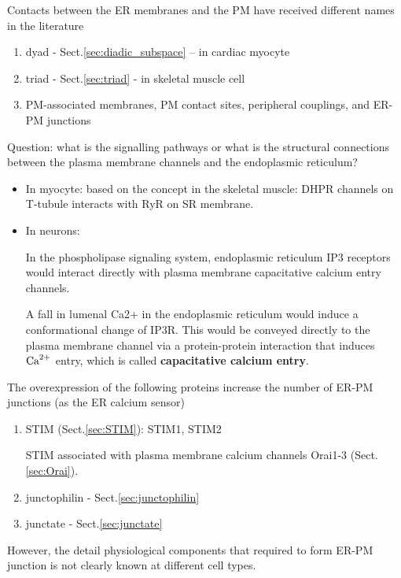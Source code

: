 Contacts between the ER membranes and the PM have received different names in the
literature
\begin{enumerate}
  \item dyad - Sect.\ref{sec:diadic_subspace} -- in cardiac myocyte
  
  \item triad - Sect.\ref{sec:triad} - in skeletal muscle cell
  
  \item PM-associated membranes, PM contact sites, peripheral
couplings, and ER-PM junctions
\end{enumerate}

\begin{mdframed}

Question: what is the signalling pathways or what is the structural connections
between the plasma membrane channels and the endoplasmic reticulum?
\begin{itemize}
  \item In myocyte: based on the concept in the skeletal muscle: DHPR channels
  on T-tubule interacts with RyR on SR membrane.

  \item In neurons:
   
In the phospholipase signaling system, endoplasmic reticulum IP3 receptors would
interact directly with plasma membrane capacitative calcium entry channels.

A fall in lumenal Ca2+ in the endoplasmic reticulum would induce a
conformational change of IP3R. This would be conveyed directly to the plasma
membrane channel via a protein-protein interaction that induces ${\text{Ca}^{2+}}$ entry,
which is called {\bf capacitative calcium entry}.

\end{itemize}

\end{mdframed}


The overexpression of the following proteins increase the number of
ER-PM junctions (as the ER calcium sensor)
\begin{enumerate}
  
  \item STIM (Sect.\ref{sec:STIM}): STIM1, STIM2

STIM associated with plasma membrane calcium channels Orai1-3
(Sect.\ref{sec:Orai}).

  \item junctophilin - Sect.\ref{sec:junctophilin}
  
  \item junctate - Sect.\ref{sec:junctate}
\end{enumerate}
However, the detail physiological components that required to form ER-PM
junction is not clearly known at different cell types.


